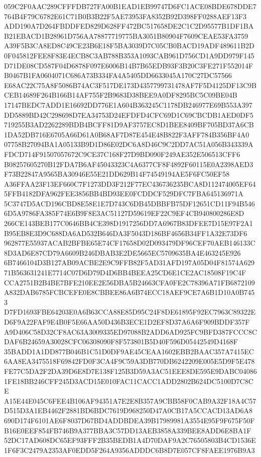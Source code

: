 \documentclass[UTF8,fontset=fandol,zihao=-4,a4paper]{ctexart}
\begin{document}
{{059C2F0AAC289CFFFDB727FA00B1EAD1EB99747D6FC1ACE08BDE678DDE7764B4F79C6782E61C71B0B3B22F5AE73953FA8352B92D398FF0288AEF13F3
ADD190A7D264FBDDFED829D628FF472BC517658DE2C1C2D95577B1DF1BAB21EBACD1B28961D756AA78877719775BA3051B80904F7609CEAE53FA3759
A39F5B3CA8ED8C49CE23B6E18F5BA3039D7C05CB0BACD19ADF489611B2D0F045812FEE8F83E4ECB8C3AB788B353A1093CAB961D756CD1A9DD979F145
D71DE08CD587F04D6878F097E6006B14B7B65EDB93F3B20C3FE271F552014FB0467B1FA0604071C686A73B334FA4A5405DD6633045A170C27DC57566
E68AC22C75A8F5086B74AC3F517DE173D4357799731478AF7F5D4125DF13C9BCEB14689F264B166B14AF755F2B9683D38BEE9A0DF8295BC5C09BE04B
17147BEDC7ADD1E16692DD776E1A604B363245C1178DB246977E69B553A397DD5889BD42C298698D7EA34753D24EFDFD4CFC69D1C69CBCDB1AED0DF5
719255B3AD2262289BDB4BCFF81D9AF3757EC8D1BEE8409BF705BD37A6CB1DA52DB716E6705A66D61A0B68AF7D87E454E48B822F3AFF784B356BF4A0
07758B27094BA1A05133B9D1D86E02DC6A8D46C9C2DD7AC51A056B343339AFDCD714F91507057672C9CE37C168F27D9BD090F249AE352E506513CFF6
B08257605270B12FDA7B6AF45043323C4A6377CF8F4892F60115E0A2398AED3F73B22847A9565BA30946E55E21DD629B14F74549194AE5F6FC50EF58
A36FFAA23F13EF660C7F1273DD3F212F77EC436736235BCA8D112474005EF645FFB4182DFA962FEE3856BB4BD93EE0FCDDCF529DFC7FBA645136971A
5C3747D5ACD196CBD8E58E1E7D743C6DB45DBBFB75DF12651CD11F94B5466D5A9786FA385F74E6B9F8E3AC51127D59619EF22C9EF4CB940800286E8D
266CE143BEB177C0646BB4CE398D1917256DD7A6967B83DFEE7D15E97F2A1B95EB8E3D9C688DA6AD532B646DA3F5043D186BF4656B34FF1A32E73DF6
962877E55937ACAB2BFBE65E74CF17658D02D093479DF96CEF70AEB146133C8D3AD6E87CD79A6609B246DBAB3E2DE5665EC5709635BA4E463245E926
6B7466104D3B127AB09ACBE2E9C9FFB82F5AD31AFD197A05D04F81574A62971B563631241E7714C07D6D79D4D6BB4BEEA25CD6E1CE2AC18508F19C4F
CCA2751B2B4BE7BFE210EE2E56DBA5B24663CFA0FE2C78396A71FB6872109A832DAB6785FCBCEFE0E8CBBEE86A6B74ECC18AEF9CE7A6B1D10A0B7453
D7FD1693FBE64203E0A6B63CCA88E85D95C24F8DE61895F92EC7963C89322ED6F9A22FAF9E4B0F5E66AA50D436B3ECE1D2EF8D37A6A6F909BDDF357F
A9D406C58D32CF8AC63A3009335ED97088B2ADD6AD925FC9BFD387FCCC8CDAF6B24659A30028CFC06308090F8F573801B5D40F596D05442549D4168F
35BADD1A1DD877B046B1C51D0DF9AE45CEAA1602EBB2BAAC357A7415EC6AA8EA3475518F69842FD0F3CA4F9C59A3DB770DB6242209E005E5D9F5E478
FE77C5DA2F2DA39D6E8D7E138F125B3D59A3AC51EEE8DE595E9DABC040861FE18BB246CFF245D3ACD15E010FAC11CACC1ADD2802B624DC5100D7C8CE
A15E44E045C6FEE4B106AF94351A7E2E8B357A9CBB58F0CAB9A32F18A4C57D515D3A1EB4462F2881BD6BDC7619D968250D47A0CB17A5CCACD13AD6A8
690D174F6101AE6F8037D67BD4ADDBDEA39B17989981A3554E95F9F675F50FB16E0EEF854FB746B9A377BBA3C57DD13AEB3858A339BEE8ADD6E8BA1F
52DC17AD608DC65EF93FFF2B35BEDB1A4D70DAF9A2C76505803B4CD1536E1F6F3C2479A2353AF0EDD5F264A9356ADDDC6B8D7E057CF8FAEE1976B9A3
}}
\end{document}

